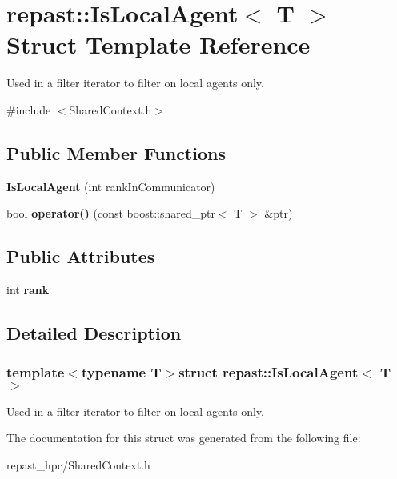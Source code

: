 \hypertarget{structrepast_1_1_is_local_agent}{\section{repast\-:\-:Is\-Local\-Agent$<$ T $>$ Struct Template Reference}
\label{structrepast_1_1_is_local_agent}
}


Used in a filter iterator to filter on local agents only.  




{\ttfamily \#include $<$Shared\-Context.\-h$>$}

\subsection*{Public Member Functions}
\begin{DoxyCompactItemize}
\item 
\hypertarget{structrepast_1_1_is_local_agent_ad29d7ef8ffc1d238fd9468277b7c5f03}{{\bfseries Is\-Local\-Agent} (int rank\-In\-Communicator)}\label{structrepast_1_1_is_local_agent_ad29d7ef8ffc1d238fd9468277b7c5f03}

\item 
\hypertarget{structrepast_1_1_is_local_agent_a55212e849b4a59eebcf2a0bd1c9b3a96}{bool {\bfseries operator()} (const boost\-::shared\-\_\-ptr$<$ T $>$ \&ptr)}\label{structrepast_1_1_is_local_agent_a55212e849b4a59eebcf2a0bd1c9b3a96}

\end{DoxyCompactItemize}
\subsection*{Public Attributes}
\begin{DoxyCompactItemize}
\item 
\hypertarget{structrepast_1_1_is_local_agent_a2cb93804105c47d43f8085f4e699687a}{int {\bfseries rank}}\label{structrepast_1_1_is_local_agent_a2cb93804105c47d43f8085f4e699687a}

\end{DoxyCompactItemize}


\subsection{Detailed Description}
\subsubsection*{template$<$typename T$>$struct repast\-::\-Is\-Local\-Agent$<$ T $>$}

Used in a filter iterator to filter on local agents only. 

The documentation for this struct was generated from the following file\-:\begin{DoxyCompactItemize}
\item 
repast\-\_\-hpc/Shared\-Context.\-h\end{DoxyCompactItemize}
